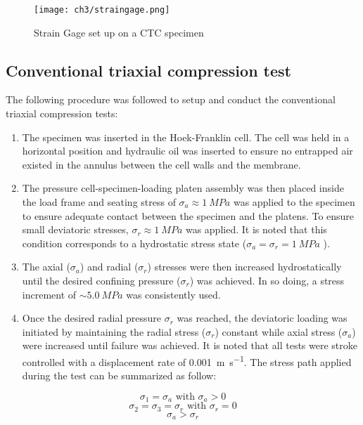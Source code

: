 \begin{figure}[tb]
    \centering
    \texttt{[image: ch3/straingage.png]}
    \caption{Strain Gage set up on a CTC specimen}
    \label{fig3:7}
\end{figure} 

\subsection{Conventional triaxial compression test} \label{ch3:Conventional-Triaxial-Compression-test}

The following procedure was followed to setup and conduct the conventional triaxial compression tests:

\begin{enumerate}
    \item The specimen was inserted in the Hoek-Franklin cell. The cell was held in a horizontal position and hydraulic oil was inserted to ensure no entrapped air existed in the annulus between the cell walls and the membrane.
    \item The pressure cell-specimen-loading platen assembly was then placed inside the load frame and seating stress of  $\sigma_a \approx \SI{1}{MPa}$ was applied to the specimen to ensure adequate contact between the specimen and the platens. To ensure small deviatoric stresses, $\sigma_r \approx \SI{1}{MPa}$ was applied. It is noted that this condition corresponds to a hydrostatic stress state ($\sigma_a = \sigma_r = \SI{1}{MPa}$ ).
    \item The axial ($\sigma_a$) and radial ($\sigma_r$) stresses were then increased hydrostatically until the desired confining pressure ($\sigma_r$) was achieved. In so doing, a stress increment of $\sim \SI{5.0}{MPa}$ was consistently used.
    \item Once the desired radial pressure $\sigma_r$ was reached, the deviatoric loading was initiated by maintaining the radial stress ($\sigma_r$) constant while axial stress ($\sigma_a$) were increased until failure was achieved. It is noted that all tests were stroke controlled with a displacement rate of \SI{0.001}{\meter\per\second}. The stress path applied during the test can be summarized as follow:
\end{enumerate}
\begin{equation}
    \sigma_1 = \sigma_a \text{ with } \sigma_a > 0
\end{equation}
\begin{equation}
    \sigma_2 = \sigma_3 = \sigma_r   \text{ with } \sigma_r = 0 
\end{equation}
\begin{equation}
    \sigma_a > \sigma_r
\end{equation}

